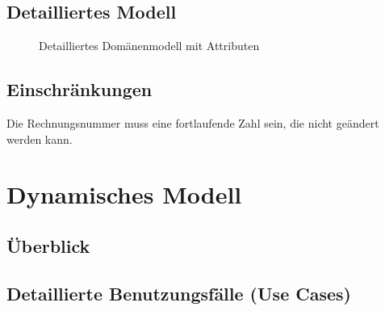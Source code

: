 \documentclass[a4paper,12pt,twoside]{scrreprt}
\begin{document}
    \section{Detailliertes Modell}
    \begin{figure}[ht!]
        \begin{center}
            \caption{Detailliertes Domänenmodell mit Attributen}\label{domainmodel_detail}
        \end{center}
    \end{figure}

    
    
    
    
    

    \section{Einschränkungen}
    Die Rechnungsnummer muss eine fortlaufende Zahl sein, die nicht geändert werden kann.

    \chapter{Dynamisches Modell}
    \section{Überblick}
    \section{Detaillierte Benutzungsfälle (Use Cases)}
        
\end{document}
